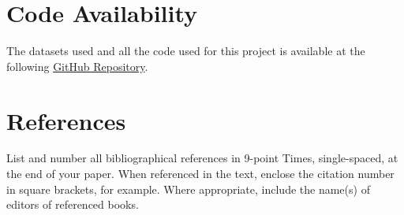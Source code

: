 \documentclass[10pt,twocolumn,letterpaper]{article}
\begin{document}
\section{Code Availability}
The datasets used and all the code used for this project is available
at the following \href{https://github.com/marcouderzo/BioData-ProteinFunctionPrediction}{GitHub Repository}.



\section{References}

List and number all bibliographical references in 9-point Times,
single-spaced, at the end of your paper. When referenced in the text,
enclose the citation number in square brackets, for
example.  Where appropriate, include the name(s) of
editors of referenced books.

%
%
\end{document}
